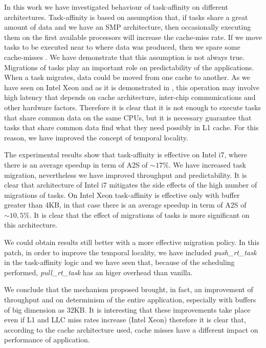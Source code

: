 In this work we have investigated behaviour of task-affinity on different architectures. Task-affinity is based on assumption that, if tasks share a great 
amount of data and we have an SMP architecture, then occasionally executing them on the first available processors will increase the cache-miss rate. If we 
move tasks to be executed near to where data was produced, then we spare some cache-misses \cite{lcs}. We have demonstrate that this assumption is not 
always true. Migrations of tasks play an important role on predictability of the applications. When a task migrates, data could be moved from one cache to 
another. As we have seen on Intel Xeon and as it is demonstrated in \cite{molka}, this operation may involve high latency that depends on cache 
architecture, inter-chip communications and other hardware factors. Therefore it is clear that it is not enough to execute tasks that share common data 
on the same CPUs, but it is necessary guarantee that tasks that share common data find what they need possibly in L1 cache. For this reason, we have 
improved the concept of temporal locality.

The experimental results show that task-affinity is effective on Intel i7, where there is an average speedup in term of A2S of $\sim 17\%$. We have 
increased task migration, nevertheless we have improved throughput and predictability. It is clear that architecture of Intel i7 mitigates the side effects 
of the high number of migrations of tasks. On Intel Xeon task-affinity is effective only with buffer greater than 4KB, in that case there is an average 
speedup in term of A2S of $\sim 10,5\%$. It is clear that the effect of migrations of tasks is more significant on this architecture.

We could obtain results still better with a more effective migration policy. In this patch, in order to improve the temporal locality, we have included 
\textit{push\_rt\_task} in the task-affinity logic and we have seen that, because of the scheduling performed, \textit{pull\_rt\_task} has an higer overhead
than vanilla. 

We conclude that the mechanism proposed brought, in fact, an improvement of throughput and on determinism of the entire application, especially with buffers
of big dimension as 32KB. It is interesting that these improvements take place even if L1 and LLC miss rates increase (Intel Xeon) therefore it is clear
that, according to the cache architecture used, cache misses have a different impact on performance of application.


